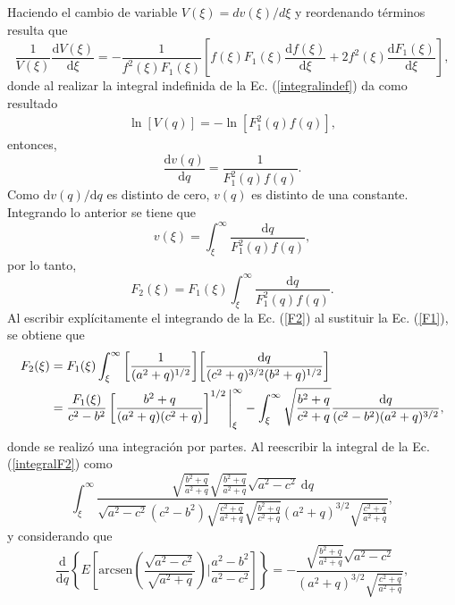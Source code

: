 Haciendo el cambio de variable $V(\xi)=dv(\xi)/d\xi$ y reordenando términos resulta que
\begin{equation}
    \frac{1}{V(\xi)}\frac{\text{d}V(\xi)}{\text{d}\xi}=-\frac{1}{f^2(\xi)F_1(\xi)}\left[f(\xi)F_1(\xi)\frac{\text{d}f(\xi)}{\text{d}\xi}+2f^2(\xi)\frac{\text{d}F_1(\xi)}{\text{d}\xi}\right],
    \label{integralindef}
\end{equation}
donde al realizar la integral indefinida de la Ec. (\ref{integralindef}) da como resultado
\begin{align*}
    \ln[V(q)]=-\ln[F_1^2(q)f(q)],
\end{align*}
entonces,
\begin{equation*}
    \frac{\text{d}v(q)}{\text{d}q}=\frac{1}{F_1^2(q)f(q)}.
\end{equation*}
Como $\text{d}v(q)/\text{d}q$ es distinto de cero,  $v(q)$ es distinto de una constante. Integrando lo anterior se tiene que
\begin{equation*}
    v(\xi)=\int_{\xi}^{\infty}\frac{\text{d}q}{F_1^2(q)f(q)},
\end{equation*}
por lo tanto, 
\begin{equation}
  F_2(\xi)=F_1(\xi)\int_{\xi}^{\infty}\frac{\text{d}q}{F_1^2(q)f(q)}.
  \label{F2}
\end{equation}
Al escribir explícitamente el integrando de la Ec. (\ref{F2}) al sustituir la Ec. (\ref{F1}), se obtiene que
\begin{align}
    F_2(\xi)&= F_1(\xi)\int_{\xi}^{\infty}\qty[\frac{1}{(a^2 + q)^{1/2}}]
    \qty[\frac{\dd{q}}{(c^2 + q)^{3/2} (b^2+q)^{1/2}}]\nonumber\\
    &=\frac{F_1(\xi)}{c^2-b^2}\left[\frac{b^2+q}{(a^2+q)(c^2+q)}\right]^{1/2}\Bigg|_\xi^{\infty}-\int_\xi^{\infty}\sqrt{\frac{b^2+q}{c^2+q}}\frac{\text{d}q}{(c^2-b^2)(a^2+q)^{3/2}},
    \label{integralF2}
\end{align}
donde se realizó una integración por partes. Al reescribir la integral de la Ec. (\ref{integralF2}) como
\begin{equation}
	\int_\xi^{\infty}\frac{\sqrt{\frac{b^2+q}{a^2+q}}\sqrt{\frac{b^2+q}{a^2+q}}\sqrt{a^2-c^2}\:\text{d}q}{\sqrt{a^2-c^2}(c^2-b^2)\sqrt{\frac{c^2+q}{a^2+q}}\sqrt{\frac{b^2+q}{c^2+q}}(a^2+q)^{3/2}\sqrt{\frac{c^2+q}{a^2+q}}},\label{eliptic}
\end{equation}
y considerando que
\begin{equation*}
	\frac{\text{d}}{\text{d}q}\left\{E\left[\mbox{arcsen}\left(\frac{\sqrt{a^2-c^2}}{\sqrt{a^2+q}}\right)\Bigg|\frac{a^2-b^2}{a^2-c^2}\right]\right\}=-\frac{\sqrt{\frac{b^2+q}{a^2+q}}\sqrt{a^2-c^2}}{(a^2+q)^{3/2}\sqrt{\frac{c^2+q}{a^2+q}}},
\end{equation*}
